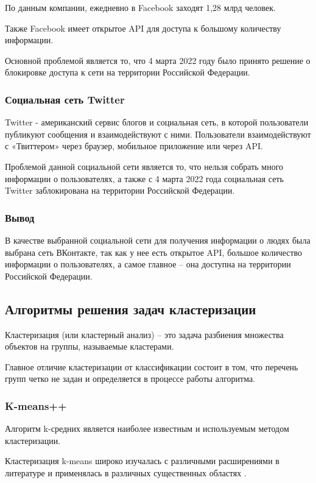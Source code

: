 По данным компании, ежедневно в Facebook заходят 1,28 млрд человек.

Также Facebook имеет открытое API для доступа к большому количеству информации.

Основной проблемой является то, что 4 марта 2022 году было принято решение о блокировке доступа к сети на территории Российской Федерации.

\subsubsection{Социальная сеть Twitter}
Twitter - американский сервис блогов и социальная сеть, в которой пользователи публикуют сообщения и взаимодействуют с ними. Пользователи взаимодействуют с «Твиттером» через браузер, мобильное приложение или через API.

Проблемой данной социальной сети является то, что нельзя собрать много информации о пользователях, а также с 4 марта 2022 года социальная сеть Twitter заблокирована на территории Российской Федерации.

\subsubsection{Вывод}
В качестве выбранной социальной сети для получения информации о людях была выбрана сеть ВКонтакте, так как у нее есть открытое API, большое количество информации о пользователях, а самое главное -- она доступна на территории Российской Федерации.

\subsection{Алгоритмы решения задач кластеризации}
Кластеризация (или кластерный анализ) \cite{ershov2016} -- это задача разбиения множества объектов на группы, называемые кластерами.

Главное отличие кластеризации от классификации состоит в том, что перечень групп четко не задан и определяется в процессе работы алгоритма. 

\subsubsection{K-means++}

Алгоритм k-средних является наиболее известным и используемым методом кластеризации. 

Кластеризация k-means широко изучалась с различными расширениями в литературе и применялась в различных существенных областях \cite{alhawarat2018revisiting}.

